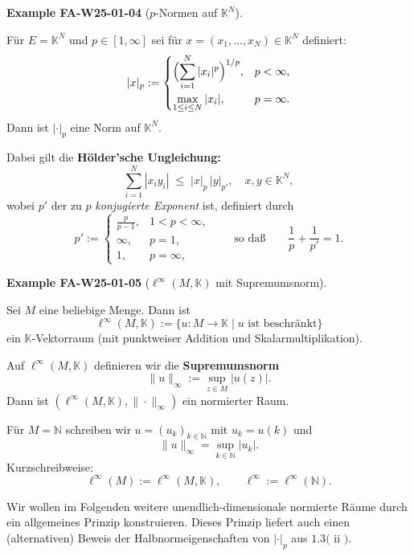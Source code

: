 \documentclass[10pt, letterpaper]{article}
\newcommand{\CustomHeading}[3]{%
  \par\medskip\noindent%
  \textbf{#1 #2} \textnormal{(#3)}.\enskip%
}
\newenvironment{EXA}[2]{\begin{unitbox}\CustomHeading{Example}{#1}{#2}}{\end{unitbox}}
\begin{document}
\begin{EXA}{FA-W25-01-04}{$p$-Normen auf $\mathbb{K}^N$}
Für $E=\mathbb{K}^N$ und $p\in[1,\infty]$ sei für $x=(x_1,\dots,x_N)\in\mathbb{K}^N$ definiert:
\[
|x|_p :=
\begin{cases}
\displaystyle \Bigl(\sum_{i=1}^N |x_i|^p\Bigr)^{1/p}, & p<\infty,\\[1em]
\displaystyle \max_{1\le i\le N} |x_i|, & p=\infty.
\end{cases}
\]
Dann ist $|\cdot|_p$ eine Norm auf $\mathbb{K}^N$.

\smallskip
Dabei gilt die \textbf{Hölder’sche Ungleichung:}
\[
\sum_{i=1}^N |x_i y_i|
\;\le\;
|x|_p\,|y|_{p'},
\quad
x,y\in\mathbb{K}^N,
\]
wobei $p'$ der zu $p$ \emph{konjugierte Exponent} ist, definiert durch
\[
p' :=
\begin{cases}
\frac{p}{p-1}, & 1<p<\infty,\\
\infty, & p=1,\\
1, & p=\infty,
\end{cases}
\qquad\text{so daß}\qquad
\frac{1}{p}+\frac{1}{p'}=1.
\]
\end{EXA}


\begin{EXA}{FA-W25-01-05}{$\ell^\infty(M,\mathbb{K})$ mit Supremumsnorm}
Sei $M$ eine beliebige Menge.  
Dann ist
\[
\ell^{\infty}(M,\mathbb{K})
:=\bigl\{u:M\to\mathbb{K}\mid u\text{ ist beschränkt}\bigr\}
\]
ein $\mathbb{K}$-Vektorraum (mit punktweiser Addition und Skalarmultiplikation).

Auf $\ell^{\infty}(M,\mathbb{K})$ definieren wir die \textbf{Supremumsnorm}
\[
\|u\|_{\infty} := \sup_{z\in M}|u(z)|.
\]
Dann ist $(\ell^{\infty}(M,\mathbb{K}),\|\cdot\|_\infty)$ ein normierter Raum.

\smallskip
Für $M=\mathbb{N}$ schreiben wir $u=(u_k)_{k\in\mathbb{N}}$ mit $u_k=u(k)$ und
\[
\|u\|_{\infty} = \sup_{k\in\mathbb{N}}|u_k|.
\]
Kurzschreibweise:
\[
\ell^{\infty}(M):=\ell^{\infty}(M,\mathbb{K}),
\qquad
\ell^{\infty}:=\ell^{\infty}(\mathbb{N}).
\]
\end{EXA}





Wir wollen im Folgenden weitere unendlich-dimensionale normierte Räume durch ein allgemeines Prinzip konstruieren. Dieses Prinzip liefert auch einen (alternativen) Beweis der Halbnormeigenschaften von $|\cdot|_{p}$ aus $1.3($ ii $)$.
\end{document}
